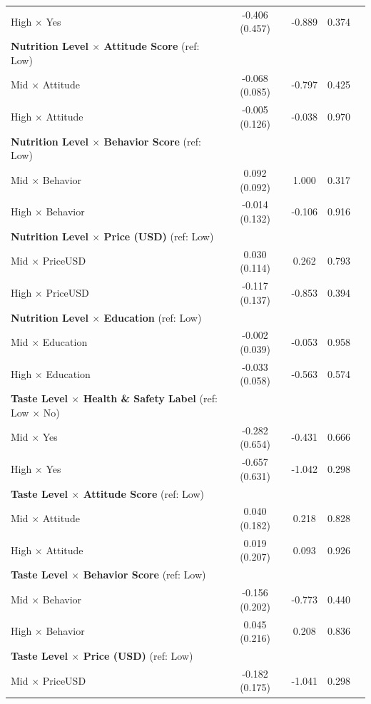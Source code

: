 \begin{center}
\begin{longtable}{lcccc}
\qquad High $\times$ Yes & -0.406 (0.457) & -0.889 & 0.374 &  \\
\quad \textbf{Nutrition Level $\times$ Attitude Score} (ref: Low) & & & & \\
\qquad Mid $\times$ Attitude & -0.068 (0.085) & -0.797 & 0.425 &  \\
\qquad High $\times$ Attitude & -0.005 (0.126) & -0.038 & 0.970 &  \\
\quad \textbf{Nutrition Level $\times$ Behavior Score} (ref: Low) & & & & \\
\qquad Mid $\times$ Behavior & 0.092 (0.092) & 1.000 & 0.317 &  \\
\qquad High $\times$ Behavior & -0.014 (0.132) & -0.106 & 0.916 &  \\
\quad \textbf{Nutrition Level $\times$ Price (USD)} (ref: Low) & & & & \\
\qquad Mid $\times$ PriceUSD & 0.030 (0.114) & 0.262 & 0.793 &  \\
\qquad High $\times$ PriceUSD & -0.117 (0.137) & -0.853 & 0.394 &  \\
\quad \textbf{Nutrition Level $\times$ Education} (ref: Low) & & & & \\
\qquad Mid $\times$ Education & -0.002 (0.039) & -0.053 & 0.958 &  \\
\qquad High $\times$ Education & -0.033 (0.058) & -0.563 & 0.574 &  \\
\quad \textbf{Taste Level $\times$ Health \& Safety Label} (ref: Low $\times$ No) & & & & \\
\qquad Mid $\times$ Yes & -0.282 (0.654) & -0.431 & 0.666 &  \\
\qquad High $\times$ Yes & -0.657 (0.631) & -1.042 & 0.298 &  \\
\quad \textbf{Taste Level $\times$ Attitude Score} (ref: Low) & & & & \\
\qquad Mid $\times$ Attitude & 0.040 (0.182) & 0.218 & 0.828 &  \\
\qquad High $\times$ Attitude & 0.019 (0.207) & 0.093 & 0.926 &  \\
\quad \textbf{Taste Level $\times$ Behavior Score} (ref: Low) & & & & \\
\qquad Mid $\times$ Behavior & -0.156 (0.202) & -0.773 & 0.440 &  \\
\qquad High $\times$ Behavior & 0.045 (0.216) & 0.208 & 0.836 &  \\
\quad \textbf{Taste Level $\times$ Price (USD)} (ref: Low) & & & & \\
\qquad Mid $\times$ PriceUSD & -0.182 (0.175) & -1.041 & 0.298 &  \\

\end{longtable}
\end{center}
